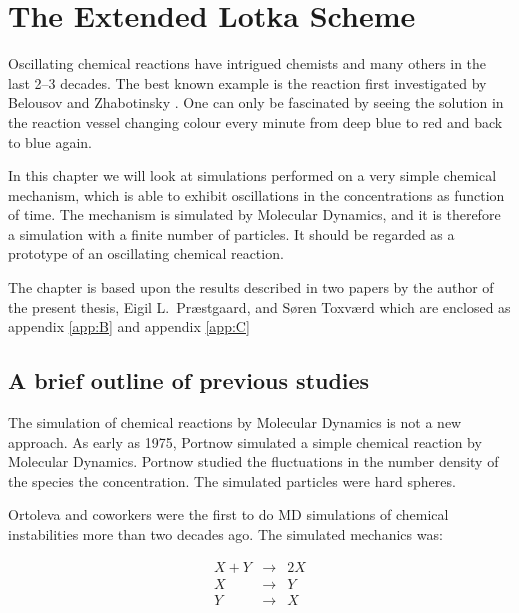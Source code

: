 
\chapter{The Extended Lotka Scheme}
\label{chap:ExtLotka}

Oscillating chemical reactions have intrigued chemists and many others
in the last 2--3 decades. The best known example is the reaction first
investigated by Belousov \cite{Belousov58} and Zhabotinsky
\cite{Zhabotinsky64}. One can only be fascinated by seeing the
solution in the reaction vessel changing colour every minute from deep
blue to red and back to blue again.

In this chapter we will look at simulations performed on a very simple
chemical mechanism, which is able to exhibit oscillations in the
concentrations as function of time. The mechanism is simulated by
Molecular Dynamics, and it is therefore a simulation with a finite
number of particles. It should be regarded as a prototype of an
oscillating chemical reaction.

The chapter is based upon the results described in two papers by the
author of the present thesis, Eigil L.\ Pr{\ae}stgaard, and
S{\o}ren Toxv{\ae}rd \cite{Geisshirt96a, Geisshirt97a} which are enclosed
as appendix \ref{app:B} and appendix \ref{app:C}


\section{A brief outline of previous studies}
The simulation of chemical reactions by Molecular Dynamics is not a
new approach. As early as 1975, Portnow \cite{Portnow75} simulated a
simple chemical reaction by Molecular Dynamics. Portnow studied the
fluctuations in the number density of the species \ie the
concentration. The simulated particles were hard spheres.

Ortoleva and coworkers \cite{Ortoleva76} were the first
to do MD simulations of chemical instabilities more than two decades
ago. The simulated mechanics was:

\begin{eqnarray*}
  X + Y &\rightarrow& 2X \\
  X     &\rightarrow& Y  \\
  Y     &\rightarrow& X
\end{eqnarray*}

